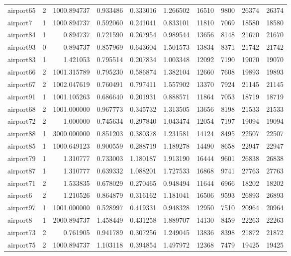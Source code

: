 \begin{longtable}{|l|r|r|r|r|r|r|r|r|r|}
airport65 & 2 & 1000.894737 & 0.933486 & 0.333016 & 1.266502 & 16510 & 9800 & 26374 & 26374 \\
airport7 & 1 & 1000.894737 & 0.592060 & 0.241041 & 0.833101 & 11810 & 7069 & 18580 & 18580 \\
airport84 & 1 & 0.894737 & 0.721590 & 0.267954 & 0.989544 & 13656 & 8148 & 21670 & 21670 \\
airport93 & 0 & 0.894737 & 0.857969 & 0.643604 & 1.501573 & 13834 & 8371 & 21742 & 21742 \\
airport83 & 1 & 1.421053 & 0.795514 & 0.207834 & 1.003348 & 12092 & 7190 & 19070 & 19070 \\
airport66 & 2 & 1001.315789 & 0.795230 & 0.586874 & 1.382104 & 12660 & 7608 & 19893 & 19893 \\
airport67 & 2 & 1002.047619 & 0.760491 & 0.797411 & 1.557902 & 13370 & 7924 & 21145 & 21145 \\
airport91 & 1 & 1001.105263 & 0.686640 & 0.201931 & 0.888571 & 11864 & 7053 & 18719 & 18719 \\
airport68 & 2 & 1001.000000 & 0.967773 & 0.345732 & 1.313505 & 13656 & 8198 & 21533 & 21533 \\
airport72 & 2 & 1.000000 & 0.745634 & 0.297840 & 1.043474 & 12054 & 7197 & 19094 & 19094 \\
airport88 & 1 & 3000.000000 & 0.851203 & 0.380378 & 1.231581 & 14124 & 8495 & 22507 & 22507 \\
airport85 & 1 & 1000.649123 & 0.900559 & 0.288719 & 1.189278 & 14490 & 8658 & 22947 & 22947 \\
airport79 & 1 & 1.310777 & 0.733003 & 1.180187 & 1.913190 & 16444 & 9601 & 26838 & 26838 \\
airport87 & 1 & 1.310777 & 0.639332 & 1.088201 & 1.727533 & 16868 & 9741 & 27763 & 27763 \\
airport71 & 2 & 1.533835 & 0.678029 & 0.270465 & 0.948494 & 11644 & 6966 & 18202 & 18202 \\
airport6 & 2 & 1.210526 & 0.864879 & 0.316162 & 1.181041 & 16506 & 9593 & 26893 & 26893 \\
airport97 & 1 & 1001.000000 & 0.528997 & 0.419331 & 0.948328 & 12950 & 7510 & 20964 & 20964 \\
airport8 & 1 & 2000.894737 & 1.458449 & 0.431258 & 1.889707 & 14130 & 8459 & 22263 & 22263 \\
airport73 & 2 & 0.761905 & 0.941789 & 0.307256 & 1.249045 & 13836 & 8398 & 21872 & 21872 \\
airport75 & 2 & 1000.894737 & 1.103118 & 0.394854 & 1.497972 & 12368 & 7479 & 19425 & 19425 \\

\end{longtable}
